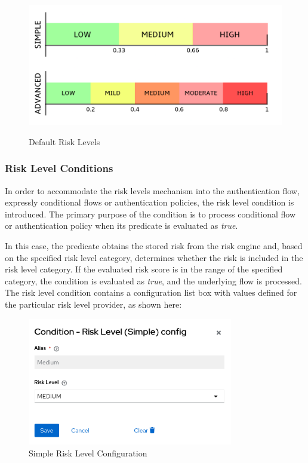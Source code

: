 \begin{figure}[htbp]
  \centering
  \includegraphics[width=1\textwidth]{img/sections/5-design/risk-levels.png}
  \label{fig:risk-levels}
  \caption{Default Risk Levels}
\end{figure}

\newpage

\subsubsection{Risk Level Conditions}
In order to accommodate the risk levels mechanism into the authentication flow, expressly conditional flows or authentication policies, the risk level condition is introduced.
The primary purpose of the condition is to process conditional flow or authentication policy when its predicate is evaluated as \textit{true}.

In this case, the predicate obtains the stored risk from the risk engine and, based on the specified risk level category, determines whether the risk is included in the risk level category.
If the evaluated risk score is in the range of the specified category, the condition is evaluated as \textit{true}, and the underlying flow is processed.
\newline
\newline
The risk level condition contains a configuration list box with values defined for the particular risk level provider, as shown here:

\begin{figure}[htbp]
  \centering
  \includegraphics[width=0.8\textwidth]{img/sections/5-design/risk-level-simple-config.png}
  \caption{Simple Risk Level Configuration}
  \label{fig:risk-levels-simple-config}
\end{figure}
\newpage
